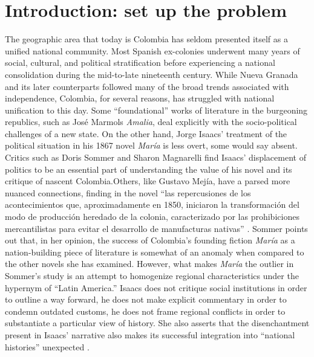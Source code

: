 

\section{Introduction: set up the problem}
The geographic area that today is Colombia has seldom presented itself as a unified national community. Most Spanish ex-colonies underwent many years of social, cultural, and political stratification before experiencing a national consolidation during the mid-to-late nineteenth century. 
While Nueva Granada and its later counterparts followed many of the broad trends associated with independence, Colombia, for several reasons, has struggled with national unification to this day.
Some \enquote{foundational} works of literature in the burgeoning republics, such as José Marmols \textit{Amalia}, deal explicitly with the socio-political challenges of a new state.
On the other hand, Jorge Isaacs’ treatment of the political situation in his 1867 novel \textit{María} is less overt, some would say absent. Critics such as Doris Sommer and Sharon Magnarelli find Isaacs’ displacement of politics to be an essential part of understanding the value of his novel and its critique of nascent Colombia.Others, like Gustavo Mejía, have a parsed more nuanced connections, finding in the novel \enquote{las repercusiones de los acontecimientos que, aproximadamente en 1850, iniciaron la transformación del modo de producción heredado de la colonia, caracterizado por las prohibiciones mercantilistas para evitar el desarrollo de manufacturas nativas} \autocite[262]{Mejia1976}.
Sommer points out that, in her opinion, the success of Colombia's founding fiction \textit{María} as a nation-building piece of literature is somewhat of an anomaly when compared to the other novels she has examined. 
However, what makes \textit{María} the outlier in Sommer's study is an attempt to homogenize regional characteristics under the hypernym of \enquote{Latin America.}
Isaacs does not critique social institutions in order to outline a way forward, he does not make explicit commentary in order to condemn outdated customs, he does not frame regional conflicts in order to substantiate a particular view of history. 
She also asserts that the disenchantment present in Isaacs' narrative also makes its successful integration into \enquote{national histories} unexpected \autocite[30]{Sommer1991}.


